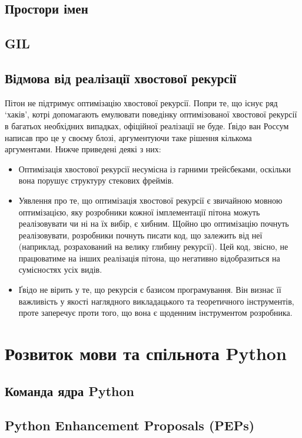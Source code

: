 \documentclass[a4paper, 12pt, onsedie]{article}
\begin{document}
\subsection{Простори імен}

\subsection{GIL}

\subsection{Відмова від реалізації хвостової рекурсії}
Пітон не підтримує оптимізацію хвостової рекурсії. Попри те, що існує ряд `хаків', котрі
допомагають емулювати поведінку оптимізованої хвостової рекурсії в багатьох необхідних
випадках, офіційної реалізації не буде. Ґвідо ван Россум написав про це у своєму блозі,
аргументуючи таке рішення кількома аргументами. Нижче приведені деякі з них:
 \begin{itemize}
    \item Оптимізація хвостової рекурсії несумісна із гарними трейсбеками, оскільки вона
    порушує структуру стекових фреймів.
    \item Уявлення про те, що оптимізація хвостової рекурсії є звичайною мовною 
    оптимізацією, яку розробники кожної імплементації пітона можуть реалізовувати чи ні на 
    їх вибір, є хибним. Щойно цю оптимізацію почнуть реалізовувати, розробники почнуть 
    писати код, що залежить від неї (наприклад, розрахований на велику глибину рекурсії). 
    Цей код, звісно, не працюватиме на інших реалізація пітона, що негативно відобразиться 
    на сумісностях усіх видів.
    \item Ґвідо не вірить у те, що рекурсія є базисом програмування. Він визнає її 
    важливість у якості наглядного викладацького та теоретичного інструментів, проте 
    заперечує проти того, що вона є щоденним інструментом розробника.
 \end{itemize}


\section{Розвиток мови та спільнота Python}

\subsection{Команда ядра Python}

\subsection{Python Enhancement Proposals (PEPs)}
\end{document}
